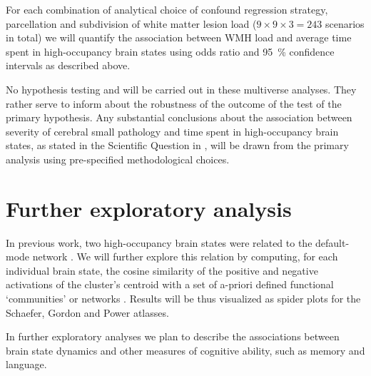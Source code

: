 

For each combination of analytical choice of confound regression strategy, parcellation and subdivision of white matter lesion load ($9\times9\times3=243$ scenarios in total) we will quantify the association between WMH load and average time spent in high-occupancy brain states using odds ratio and \qty{95}{\percent} confidence intervals as described above.

No hypothesis testing and will be carried out in these multiverse analyses. They rather serve to inform about the robustness of the outcome of the test of the primary hypothesis.
Any substantial conclusions about the association between severity of cerebral small pathology and time spent in high-occupancy brain states, as stated in the Scientific Question in , will be drawn from the primary analysis using pre-specified methodological choices.

\section{Further exploratory analysis}
In previous work, two high-occupancy brain states were related to the default-mode network \citep{Cornblath2020-fu}.
We will further explore this relation by computing, for each individual brain state, the cosine similarity of the positive and negative activations of the cluster’s centroid with a set of a-priori defined functional ‘communities’ or networks \citep{Schaefer2018-bo,Yeo2011-qg}.
Results will be thus visualized as spider plots for the Schaefer, Gordon and Power atlasses.

In further exploratory analyses we plan to describe the associations between brain state dynamics and other measures of cognitive ability, such as memory and language.